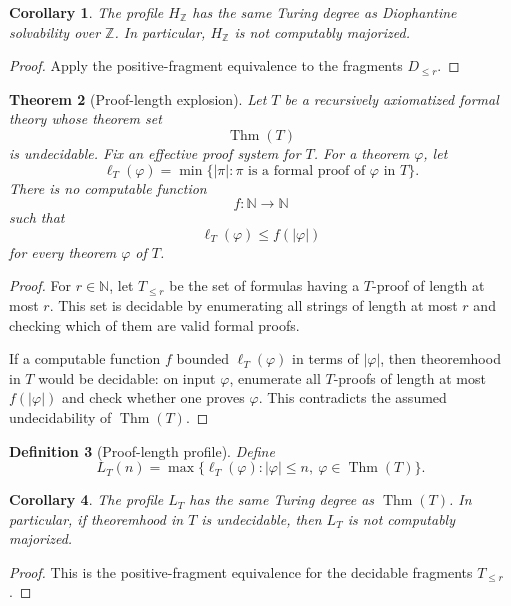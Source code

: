 \documentclass[11pt]{article}
\newtheorem{theorem}{Theorem}[section]
\newtheorem{corollary}[theorem]{Corollary}
\newtheorem{definition}[theorem]{Definition}
\begin{document}
\begin{corollary}
The profile \(H_{\mathbb Z}\) has the same Turing degree as Diophantine solvability over \(\mathbb Z\). In particular, \(H_{\mathbb Z}\) is not computably majorized.
\end{corollary}

\begin{proof}
Apply the positive-fragment equivalence to the fragments \(D_{\leq r}\).
\end{proof}

\begin{theorem}[Proof-length explosion]
Let \(T\) be a recursively axiomatized formal theory whose theorem set
\[
\operatorname{Thm}(T)
\]
is undecidable. Fix an effective proof system for \(T\). For a theorem \(\varphi\), let
\[
\ell_T(\varphi)=
\min\{|\pi|:\pi\text{ is a formal proof of }\varphi\text{ in }T\}.
\]
There is no computable function
\[
f:\mathbb N\to\mathbb N
\]
such that
\[
\ell_T(\varphi)\leq f(|\varphi|)
\]
for every theorem \(\varphi\) of \(T\).
\end{theorem}

\begin{proof}
For \(r\in\mathbb N\), let \(T_{\leq r}\) be the set of formulas having a \(T\)-proof of length at most \(r\). This set is decidable by enumerating all strings of length at most \(r\) and checking which of them are valid formal proofs.

If a computable function \(f\) bounded \(\ell_T(\varphi)\) in terms of \(|\varphi|\), then theoremhood in \(T\) would be decidable: on input \(\varphi\), enumerate all \(T\)-proofs of length at most \(f(|\varphi|)\) and check whether one proves \(\varphi\). This contradicts the assumed undecidability of \(\operatorname{Thm}(T)\).
\end{proof}

\begin{definition}[Proof-length profile]
Define
\[
L_T(n)=
\max\{\ell_T(\varphi):|\varphi|\leq n,\ \varphi\in\operatorname{Thm}(T)\}.
\]
\end{definition}

\begin{corollary}
The profile \(L_T\) has the same Turing degree as \(\operatorname{Thm}(T)\). In particular, if theoremhood in \(T\) is undecidable, then \(L_T\) is not computably majorized.
\end{corollary}

\begin{proof}
This is the positive-fragment equivalence for the decidable fragments \(T_{\leq r}\).
\end{proof}
\end{document}

